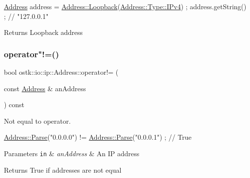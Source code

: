 \begin{DoxyCode}
\hyperlink{classostk_1_1io_1_1ip_1_1_address_a4118f42388b11fb003c9fb782f4ca04f}{Address} address = \hyperlink{classostk_1_1io_1_1ip_1_1_address_af632da7f131b2a6649d2927ebb6ba60c}{Address::Loopback}(\hyperlink{classostk_1_1io_1_1ip_1_1_address_a03b78ae8f7ddbb893d7396e6a1baf695a42a9137a05a60eb752dcdf982e717626}{Address::Type::IPv4}) ;
address.getString() ; \textcolor{comment}{// "127.0.0.1"}
\end{DoxyCode}


\begin{DoxyReturn}{Returns}
Loopback address 
\end{DoxyReturn}
\mbox{\label{classostk_1_1io_1_1ip_1_1_address_ae9cde5193e1957664d3c51b77d38f3f3}} 
\subsubsection{\texorpdfstring{operator"!=()}{operator!=()}}
{\footnotesize\ttfamily bool ostk\+::io\+::ip\+::\+Address\+::operator!= (\begin{DoxyParamCaption}\item[{const \hyperlink{classostk_1_1io_1_1ip_1_1_address}{Address} \&}]{an\+Address }\end{DoxyParamCaption}) const}



Not equal to operator. 


\begin{DoxyCode}
\hyperlink{classostk_1_1io_1_1ip_1_1_address_a3d60e44d816e30f17db36f9bb7ac6307}{Address::Parse}(\textcolor{stringliteral}{"0.0.0.0"}) != \hyperlink{classostk_1_1io_1_1ip_1_1_address_a3d60e44d816e30f17db36f9bb7ac6307}{Address::Parse}(\textcolor{stringliteral}{"0.0.0.1"}) ; \textcolor{comment}{// True}
\end{DoxyCode}



\begin{DoxyParams}[1]{Parameters}
\mbox{\tt in}  & {\em an\+Address} & An IP address \\
\hline
\end{DoxyParams}
\begin{DoxyReturn}{Returns}
True if addresses are not equal 
\end{DoxyReturn}
\mbox{\label{classostk_1_1io_1_1ip_1_1_address_a2154bcedb7622c8e1813e45efcdaaa95}} 

